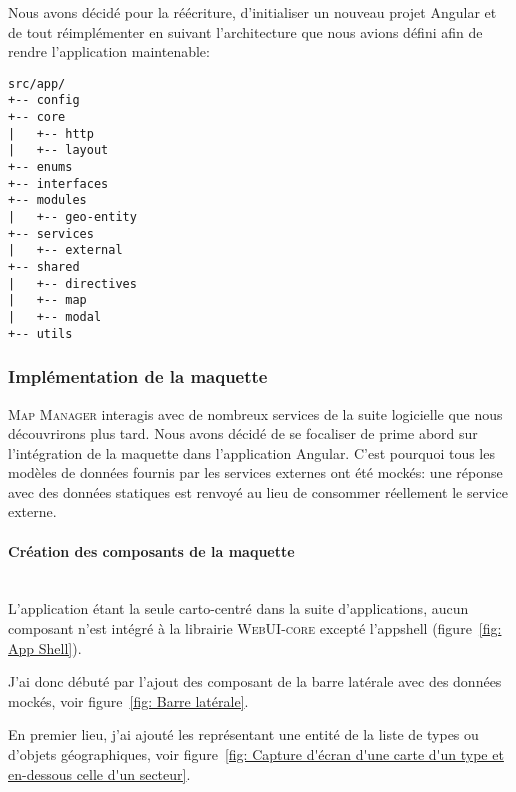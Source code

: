 \documentclass{rapportUHA40}
\begin{document}
Nous avons décidé pour la réécriture, d'initialiser un nouveau projet Angular
et de tout réimplémenter en suivant l'architecture que nous avions défini afin
de rendre l'application maintenable:

\begin{verbatim}
src/app/
+-- config
+-- core
|   +-- http
|   +-- layout
+-- enums
+-- interfaces
+-- modules
|   +-- geo-entity
+-- services
|   +-- external
+-- shared
|   +-- directives
|   +-- map
|   +-- modal
+-- utils
\end{verbatim}

\subsubsection{Implémentation de la maquette}
\textsc{Map Manager} interagis avec de nombreux services de la suite logicielle
que nous découvrirons plus tard. Nous avons décidé de se focaliser de prime
abord sur l'intégration de la maquette dans l'application Angular. C'est
pourquoi tous les modèles de données fournis par les services externes ont été
mockés: une réponse  \fg{} avec des données statiques est renvoyé au
lieu de consommer réellement le service externe.

\paragraph{Création des composants de la maquette}\mbox{}\\
L'application étant la seule carto-centré dans la suite d'applications, aucun
composant n'est intégré à la librairie \textsc{WebUI-core} excepté
l'\gls{appshell} (figure~\ref{fig: App Shell}).

\newpage
J'ai donc débuté par l'ajout des composant de la barre latérale avec des
données mockés, voir figure~\ref{fig: Barre latérale}.


En premier lieu, j'ai ajouté les  \fg{} représentant une entité de la
liste de types ou d'objets géographiques, voir figure~\ref{fig: Capture d'écran
  d'une carte d'un type et en-dessous celle d'un secteur}.
\end{document}
